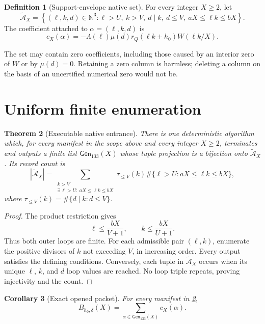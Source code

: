 \documentclass[11pt]{article}
\newtheorem{theorem}{Theorem}[section]
\newtheorem{corollary}[theorem]{Corollary}
\theoremstyle{definition}
\newtheorem{definition}[theorem]{Definition}
\theoremstyle{remark}
\newcommand{\At}{\widetilde{\mathcal A}}
\begin{document}
\begin{definition}[Support-envelope native set]
For every integer \(X\ge2\), let
\[
 \At_X=\left\{(\ell,k,d)\in\mathbb N^3:
 \ell>U,\ k>V,\ d\mid k,\ d\le V,\
 aX\le\ell k\le bX\right\}.
\]
The coefficient attached to \(\alpha=(\ell,k,d)\) is
\begin{equation}
 c_X(\alpha)=
 -\Lambda(\ell)\mu(d)r_Q(\ell k+h_0)W(\ell k/X).
 \label{eq:coefficient}
\end{equation}
\end{definition}

The set may contain zero coefficients, including those caused by an
interior zero of \(W\) or by \(\mu(d)=0\).  Retaining a zero column is
harmless; deleting a column on the basis of an uncertified numerical
zero would not be.

\section{Uniform finite enumeration}

\begin{theorem}[Executable native entrance]
\label{thm:generator}
There is one deterministic algorithm which, for every manifest in the
scope above and every integer \(X\ge2\), terminates and outputs a
finite list \(\mathsf{Gen}_{133}(X)\) whose tuple projection is a
bijection onto \(\At_X\).  Its record count is
\[
 |\At_X|
 =
 \sum_{\substack{k>V\\ \exists\,\ell>U:\ aX\le\ell k\le bX}}
 \tau_{\le V}(k)
 \#\{\ell>U:aX\le\ell k\le bX\},
\]
where
\(\tau_{\le V}(k)=\#\{d\mid k:d\le V\}\).
\end{theorem}

\begin{proof}
The product restriction gives
\[
 \ell\le \frac{bX}{V+1},
 \qquad
 k\le \frac{bX}{U+1}.
\]
Thus both outer loops are finite.  For each admissible pair
\((\ell,k)\), enumerate the positive divisors of \(k\) not exceeding
\(V\), in increasing order.  Every output satisfies the defining
conditions.  Conversely, each tuple in \(\At_X\) occurs when its
unique \(\ell\), \(k\), and \(d\) loop values are reached.  No loop
triple repeats, proving injectivity and the count.
\end{proof}

\begin{corollary}[Exact opened packet]
\label{cor:packet}
For every manifest in \cref{thm:generator},
\[
 \boxed{
 B_{h_0,\delta}(X)
 =\sum_{\alpha\in\mathsf{Gen}_{133}(X)}c_X(\alpha).}
\]
\end{corollary}
\end{document}
